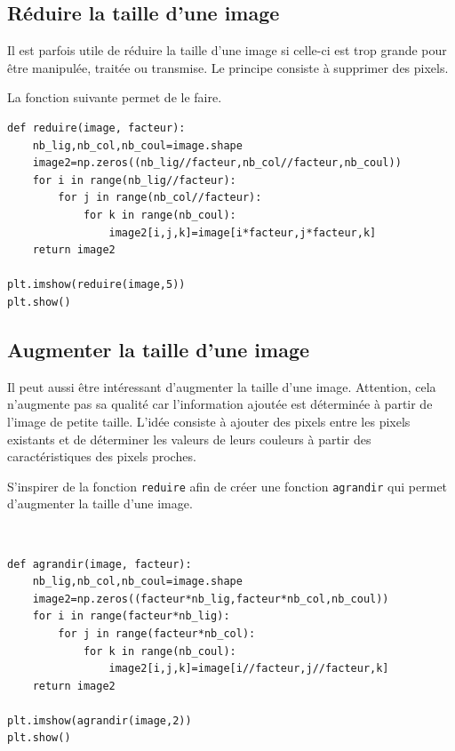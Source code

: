 \subsection{Réduire la taille d'une image}

Il est parfois utile de réduire la taille d'une image si celle-ci est trop grande pour être manipulée, traitée ou transmise. Le principe consiste à supprimer des pixels.

La fonction suivante permet de le faire.

\begin{verbatim}
def reduire(image, facteur):
    nb_lig,nb_col,nb_coul=image.shape
    image2=np.zeros((nb_lig//facteur,nb_col//facteur,nb_coul))
    for i in range(nb_lig//facteur):
        for j in range(nb_col//facteur):
            for k in range(nb_coul):
                image2[i,j,k]=image[i*facteur,j*facteur,k]
    return image2

plt.imshow(reduire(image,5))
plt.show()
\end{verbatim}

\subsection{Augmenter la taille d'une image}

Il peut aussi être intéressant d'augmenter la taille d'une image. Attention, cela n'augmente pas sa qualité car l'information ajoutée est déterminée à partir de l'image de petite taille. L'idée consiste à ajouter des pixels entre les pixels existants et de déterminer les valeurs de leurs couleurs à partir des caractéristiques des pixels proches.

\begin{exercice}
S'inspirer de la fonction \verb?reduire? afin de créer une fonction \verb?agrandir? qui permet d'augmenter la taille d'une image.
\end{exercice}

\begin{solution}~\\
\vspace{-0.7cm}
\begin{verbatim}
def agrandir(image, facteur):
    nb_lig,nb_col,nb_coul=image.shape
    image2=np.zeros((facteur*nb_lig,facteur*nb_col,nb_coul))
    for i in range(facteur*nb_lig):
        for j in range(facteur*nb_col):
            for k in range(nb_coul):
                image2[i,j,k]=image[i//facteur,j//facteur,k]
    return image2

plt.imshow(agrandir(image,2))
plt.show()
\end{verbatim} 
\end{solution}

